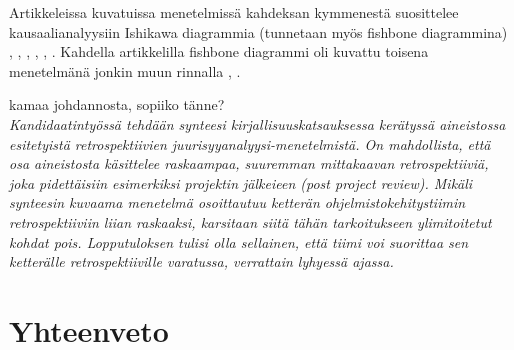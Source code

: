 Artikkeleissa kuvatuissa menetelmissä kahdeksan kymmenestä suosittelee kausaalianalyysiin Ishikawa diagrammia (tunnetaan myös fishbone diagrammina) \citep{kalinowski2012evidence}, \citep{de2004learning}, \citep{staalhane2004root}, \citep{dingsoyr2003extending}, \citep{birk2002postmortem}, \citep{card1998learning}. Kahdella artikkelilla fishbone diagrammi oli kuvattu toisena menetelmänä jonkin muun rinnalla \citep{Bjornson2009}, \citep{staalhane2003post}.



kamaa johdannosta, sopiiko tänne?\\
\textit{Kandidaatintyössä tehdään synteesi kirjallisuuskatsauksessa kerätyssä aineistossa esitetyistä retrospektiivien juurisyyanalyysi-menetelmistä. On mahdollista, että osa aineistosta käsittelee raskaampaa, suuremman mittakaavan retrospektiiviä, joka pidettäisiin esimerkiksi projektin jälkeieen (post project review). Mikäli synteesin kuvaama menetelmä osoittautuu ketterän ohjelmistokehitystiimin retrospektiiviin liian raskaaksi, karsitaan siitä tähän tarkoitukseen ylimitoitetut kohdat pois. Lopputuloksen tulisi olla sellainen, että tiimi voi suorittaa sen ketterälle retrospektiiville varatussa, verrattain lyhyessä ajassa.}

\section{Yhteenveto}
